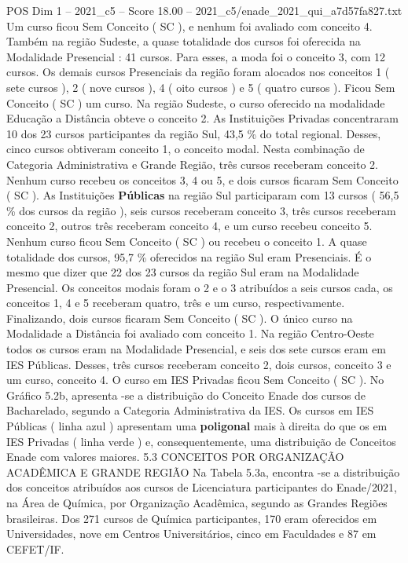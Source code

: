 \begin{textsample}{POS Dim 1 – 2021\_c5 – Score 18.00 – 2021\_c5/enade\_2021\_qui\_a7d57fa827.txt}
Um curso ficou Sem Conceito ( SC ), e nenhum foi avaliado com conceito 4.
Também na região Sudeste, a quase totalidade dos cursos foi oferecida na Modalidade Presencial : 41 cursos.
Para esses, a moda foi o conceito 3, com 12 cursos.
Os demais cursos Presenciais da região foram alocados nos conceitos 1 ( sete cursos ), 2 ( nove cursos ), 4 ( oito cursos ) e 5 ( quatro cursos ).
Ficou Sem Conceito ( SC ) um curso.
Na região Sudeste, o curso oferecido na modalidade Educação a Distância obteve o conceito 2.
As Instituições Privadas concentraram 10 dos 23 cursos participantes da região Sul, 43,5 \% do total regional.
Desses, cinco cursos obtiveram conceito 1, o conceito modal.
Nesta combinação de Categoria Administrativa e Grande Região, três cursos receberam conceito 2.
Nenhum curso recebeu os conceitos 3, 4 ou 5, e dois cursos ficaram Sem Conceito ( SC ).
As Instituições \textbf{Públicas} na região Sul participaram com 13 cursos ( 56,5 \% dos cursos da região ), seis cursos receberam conceito 3, três cursos receberam conceito 2, outros três receberam conceito 4, e um curso recebeu conceito 5.
Nenhum curso ficou Sem Conceito ( SC ) ou recebeu o conceito 1.
A quase totalidade dos cursos, 95,7 \% oferecidos na região Sul eram Presenciais.
É o mesmo que dizer que 22 dos 23 cursos da região Sul eram na Modalidade Presencial.
Os conceitos modais foram o 2 e o 3 atribuídos a seis cursos cada, os conceitos 1, 4 e 5 receberam quatro, três e um curso, respectivamente.
Finalizando, dois cursos ficaram Sem Conceito ( SC ).
O único curso na Modalidade a Distância foi avaliado com conceito 1.
Na região Centro-Oeste todos os cursos eram na Modalidade Presencial, e seis dos sete cursos eram em IES Públicas.
Desses, três cursos receberam conceito 2, dois cursos, conceito 3 e um curso, conceito 4.
O curso em IES Privadas ficou Sem Conceito ( SC ).
No Gráfico 5.2b, apresenta -se a distribuição do Conceito Enade dos cursos de Bacharelado, segundo a Categoria Administrativa da IES.
Os cursos em IES Públicas ( linha azul ) apresentam uma \textbf{poligonal} mais à direita do que os em IES Privadas ( linha verde ) e, consequentemente, uma distribuição de Conceitos Enade com valores maiores. 5.3 CONCEITOS POR ORGANIZAÇÃO ACADÊMICA E GRANDE REGIÃO Na Tabela 5.3a, encontra -se a distribuição dos conceitos atribuídos aos cursos de Licenciatura participantes do Enade/2021, na Área de Química, por Organização Acadêmica, segundo as Grandes Regiões brasileiras.
Dos 271 cursos de Química participantes, 170 eram oferecidos em Universidades, nove em Centros Universitários, cinco em Faculdades e 87 em CEFET/IF.

\end{textsample}
